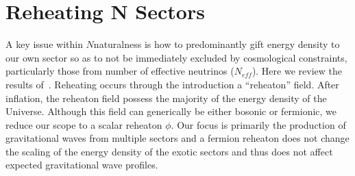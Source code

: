 \documentclass[nofootinbib,twocolumn,preprintnumbers]{revtex4-1}
\begin{document}
\section{Reheating N Sectors}
\label{sec:reheat}
A key issue within $N$naturalness is how to predominantly gift energy density to our own sector so as to not be immediately excluded by cosmological constraints, particularly those from number of effective neutrinos ($N_{eff}$). Here we review the results of~\cite{Arkani-Hamed:2016rle}. Reheating occurs through the introduction a ``reheaton'' field. After inflation, the reheaton field possess the majority of the energy density of the Universe. Although this field can generically be either bosonic or fermionic, we reduce our scope to a scalar reheaton $\phi$. Our focus is primarily the production of gravitational waves from multiple sectors and a fermion reheaton does not change the scaling of the energy density of the exotic sectors and thus does not affect expected gravitational wave profiles.
\end{document}
